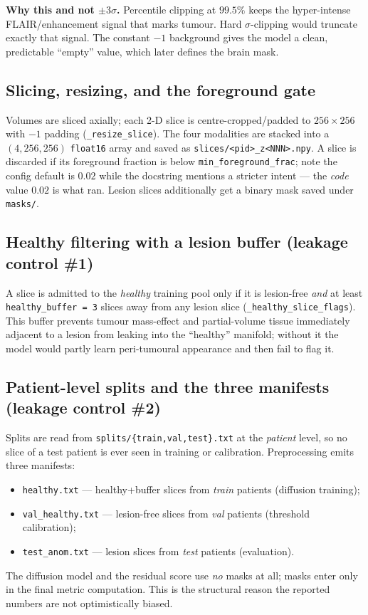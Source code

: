 \documentclass[11pt,a4paper]{article}
\newcommand{\code}[1]{\texttt{\small #1}}
\begin{document}
\textbf{Why this and not $\pm3\sigma$.} Percentile clipping at $99.5\%$ keeps the
hyper-intense FLAIR/enhancement signal that marks tumour. Hard $\sigma$-clipping
would truncate exactly that signal. The constant $-1$ background gives the model
a clean, predictable ``empty'' value, which later defines the brain mask.

\subsection{Slicing, resizing, and the foreground gate}
Volumes are sliced axially; each 2-D slice is centre-cropped/padded to
$256\times256$ with $-1$ padding (\code{\_resize\_slice}). The four modalities are
stacked into a $(4,256,256)$ \code{float16} array and saved as
\code{slices/<pid>\_z<NNN>.npy}. A slice is discarded if its foreground fraction
is below \code{min\_foreground\_frac}; note the config default is $0.02$ while the
docstring mentions a stricter intent --- the \emph{code} value $0.02$ is what
ran. Lesion slices additionally get a binary mask saved under \code{masks/}.

\subsection{Healthy filtering with a lesion buffer (leakage control \#1)}
A slice is admitted to the \emph{healthy} training pool only if it is lesion-free
\emph{and} at least \code{healthy\_buffer = 3} slices away from any lesion slice
(\code{\_healthy\_slice\_flags}). This buffer prevents tumour mass-effect and
partial-volume tissue immediately adjacent to a lesion from leaking into the
``healthy'' manifold; without it the model would partly learn peri-tumoural
appearance and then fail to flag it.

\subsection{Patient-level splits and the three manifests (leakage control \#2)}
Splits are read from \code{splits/\{train,val,test\}.txt} at the
\emph{patient} level, so no slice of a test patient is ever seen in training or
calibration. Preprocessing emits three manifests:
\begin{itemize}[leftmargin=1.4em,itemsep=0pt]
\item \code{healthy.txt} --- healthy+buffer slices from \emph{train} patients (diffusion training);
\item \code{val\_healthy.txt} --- lesion-free slices from \emph{val} patients (threshold calibration);
\item \code{test\_anom.txt} --- lesion slices from \emph{test} patients (evaluation).
\end{itemize}
The diffusion model and the residual score use \emph{no} masks at all; masks
enter only in the final metric computation. This is the structural reason the
reported numbers are not optimistically biased.
\end{document}
